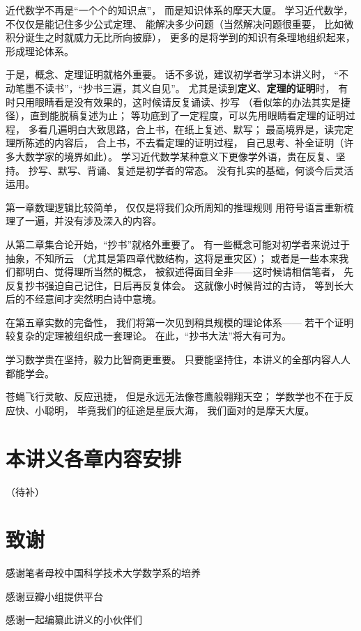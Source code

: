 近代数学不再是“一个个的知识点”，
而是知识体系的摩天大厦。
学习近代数学，不仅仅是能记住多少公式定理、
能解决多少问题（当然解决问题很重要，
比如微积分诞生之时就威力无比所向披靡），
更多的是将学到的知识有条理地组织起来，
形成理论体系。

于是，概念、定理证明就格外重要。
话不多说，建议初学者学习本讲义时，
“不动笔墨不读书”，“抄书三遍，其义自见”。
尤其是读到\textbf{定义}、\textbf{定理的证明}时，
有时只用眼睛看是没有效果的，这时候请反复诵读、抄写
（看似笨的办法其实是捷径），直到能脱稿复述为止；
等功底到了一定程度，可以先用眼睛看定理的证明过程，
多看几遍明白大致思路，合上书，在纸上复述、默写；
最高境界是，读完定理所陈述的内容后，
合上书，不去看定理的证明过程，
自己思考、补全证明（许多大数学家的境界如此）。
学习近代数学某种意义下更像学外语，贵在反复、坚持。
抄写、默写、背诵、复述是初学者的常态。
没有扎实的基础，何谈今后灵活运用。\vs

第一章数理逻辑比较简单，
仅仅是将我们众所周知的推理规则
用符号语言重新梳理了一遍，并没有涉及深入的内容。

从第二章集合论开始，“抄书”就格外重要了。
有一些概念可能对初学者来说过于抽象，不知所云
（尤其是第四章代数结构，这将是重灾区）；
或者是一些本来我们都明白、觉得理所当然的概念，
被叙述得面目全非——这时候请相信笔者，
先反复抄书强迫自己记住，日后再反复体会。
这就像小时候背过的古诗，
等到长大后的不经意间才突然明白诗中意境。

在第五章实数的完备性，
我们将第一次见到稍具规模的理论体系——
若干个证明较复杂的定理被组织成一套理论。
在此，“抄书大法”将大有可为。\vs

学习数学贵在坚持，毅力比智商更重要。
只要能坚持住，本讲义的全部内容人人都能学会。

苍蝇飞行灵敏、反应迅捷，
但是永远无法像苍鹰般翱翔天空；
学数学也不在于反应快、小聪明，
毕竟我们的征途是星辰大海，
我们面对的是摩天大厦。

\section*{本讲义各章内容安排}

（待补）

\newpage

\section*{致谢}

感谢笔者母校中国科学技术大学数学系的培养

感谢豆瓣小组提供平台

感谢一起编纂此讲义的小伙伴们
\vspp

